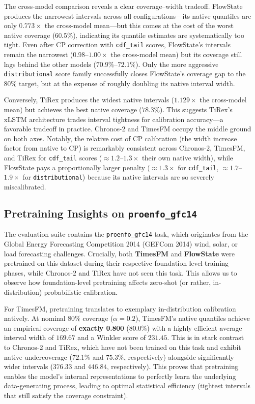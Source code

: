 \documentclass[12pt, a4paper]{article}
\begin{document}
The cross-model comparison reveals a clear coverage--width tradeoff. FlowState produces the narrowest intervals across all configurations---its native quantiles are only \(0.773\times\) the cross-model mean---but this comes at the cost of the worst native coverage (\(60.5\%\)), indicating its quantile estimates are systematically too tight. Even after CP correction with \texttt{cdf\_tail} scores, FlowState's intervals remain the narrowest (\(0.98\)--\(1.00\times\) the cross-model mean) but its coverage still lags behind the other models (\(70.9\%\)--\(72.1\%\)). Only the more aggressive \texttt{distributional} score family successfully closes FlowState's coverage gap to the \(80\%\) target, but at the expense of roughly doubling its native interval width.

Conversely, TiRex produces the widest native intervals (\(1.129\times\) the cross-model mean) but achieves the best native coverage (\(78.3\%\)). This suggests TiRex's xLSTM architecture trades interval tightness for calibration accuracy---a favorable tradeoff in practice. Chronos-2 and TimesFM occupy the middle ground on both axes. Notably, the relative cost of CP calibration (the width increase factor from native to CP) is remarkably consistent across Chronos-2, TimesFM, and TiRex for \texttt{cdf\_tail} scores (\(\approx 1.2\)--\(1.3\times\) their own native width), while FlowState pays a proportionally larger penalty (\(\approx 1.3\times\) for \texttt{cdf\_tail}, \(\approx 1.7\)--\(1.9\times\) for \texttt{distributional}) because its native intervals are so severely miscalibrated.

\subsection{Pretraining Insights on \texttt{proenfo\_gfc14}} \label{subsec:pretraining_gfc14}
The evaluation suite contains the \texttt{proenfo\_gfc14} task, which originates from the Global Energy Forecasting Competition 2014 (GEFCom 2014) wind, solar, or load forecasting challenges. Crucially, both \textbf{TimesFM} and \textbf{FlowState} were pretrained on this dataset during their respective foundation-level training phases, while Chronos-2 and TiRex have not seen this task. This allows us to observe how foundation-level pretraining affects zero-shot (or rather, in-distribution) probabilistic calibration.

For TimesFM, pretraining translates to exemplary in-distribution calibration natively. At nominal \(80\%\) coverage (\(\alpha=0.2\)), TimesFM's native quantiles achieve an empirical coverage of \textbf{exactly 0.800} (80.0\%) with a highly efficient average interval width of \(169.67\) and a Winkler score of \(231.45\). This is in stark contrast to Chronos-2 and TiRex, which have not been trained on this task and exhibit native undercoverage (\(72.1\%\) and \(75.3\%\), respectively) alongside significantly wider intervals (\(376.33\) and \(446.84\), respectively). This proves that pretraining enables the model's internal representations to perfectly learn the underlying data-generating process, leading to optimal statistical efficiency (tightest intervals that still satisfy the coverage constraint).
\end{document}
